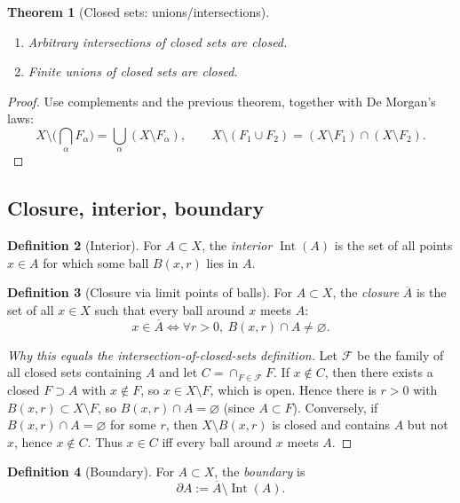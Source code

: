 \documentclass[11pt]{article}
\newtheorem{theorem}{Theorem}[section]
\theoremstyle{definition}
\newtheorem{definition}[theorem]{Definition}
\newcommand{\ol}[1]{\overline{#1}}
\newcommand{\Int}{\operatorname{Int}}
\newcommand{\Bd}{\partial}
\begin{document}
\begin{theorem}[Closed sets: unions/intersections]
\begin{enumerate}[label=\textbf{(\alph*)}]
\item Arbitrary intersections of closed sets are closed.
\item Finite unions of closed sets are closed.
\end{enumerate}
\end{theorem}

\begin{proof}
Use complements and the previous theorem, together with De Morgan's laws:
\[
X\setminus \Big(\bigcap_\alpha F_\alpha\Big)=\bigcup_\alpha (X\setminus F_\alpha),\qquad
X\setminus (F_1\cup F_2)= (X\setminus F_1)\cap (X\setminus F_2).
\]
\end{proof}

\subsection{Closure, interior, boundary}

\begin{definition}[Interior]
For $A\subset X$, the \emph{interior} $\Int(A)$ is the set of all points $x\in A$ for which some ball $B(x,r)$ lies in $A$.
\end{definition}

\begin{definition}[Closure via limit points of balls]
For $A\subset X$, the \emph{closure} $\ol A$ is the set of all $x\in X$ such that every ball around $x$ meets $A$:
\[
x\in\ol A \iff \forall r>0,\ B(x,r)\cap A\neq \varnothing.
\]
\end{definition}

\begin{proof}[Why this equals the intersection-of-closed-sets definition]
Let $\mathcal F$ be the family of all closed sets containing $A$ and let $C=\cap_{F\in\mathcal F} F$.
If $x\notin C$, then there exists a closed $F\supset A$ with $x\notin F$, so $x\in X\setminus F$, which is open.
Hence there is $r>0$ with $B(x,r)\subset X\setminus F$, so $B(x,r)\cap A=\varnothing$ (since $A\subset F$).
Conversely, if $B(x,r)\cap A=\varnothing$ for some $r$, then $X\setminus B(x,r)$ is closed and contains $A$ but not $x$,
hence $x\notin C$.
Thus $x\in C$ iff every ball around $x$ meets $A$.
\end{proof}

\begin{definition}[Boundary]
For $A\subset X$, the \emph{boundary} is
\[
\Bd A := \ol A\setminus \Int(A).
\]
\end{definition}
\end{document}
